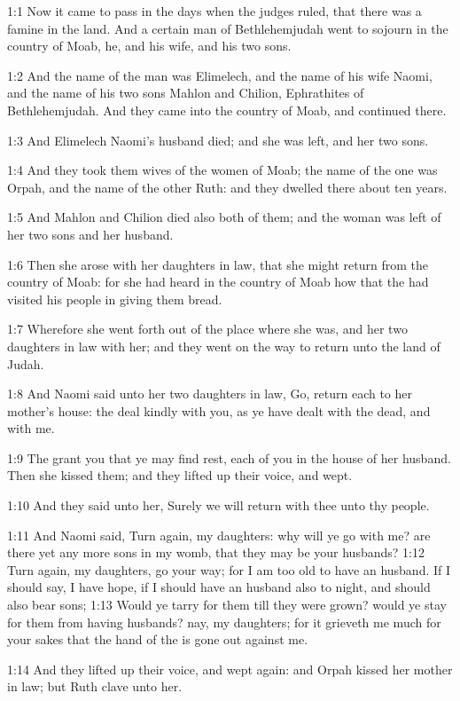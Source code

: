 
1:1 Now it came to pass in the days when the judges ruled, that there
was a famine in the land. And a certain man of Bethlehemjudah went to
sojourn in the country of Moab, he, and his wife, and his two sons.

1:2 And the name of the man was Elimelech, and the name of his wife
Naomi, and the name of his two sons Mahlon and Chilion, Ephrathites of
Bethlehemjudah. And they came into the country of Moab, and continued
there.

1:3 And Elimelech Naomi's husband died; and she was left, and her two
sons.

1:4 And they took them wives of the women of Moab; the name of the one
was Orpah, and the name of the other Ruth: and they dwelled there
about ten years.

1:5 And Mahlon and Chilion died also both of them; and the woman was
left of her two sons and her husband.

1:6 Then she arose with her daughters in law, that she might return
from the country of Moab: for she had heard in the country of Moab how
that the \LORD had visited his people in giving them bread.

1:7 Wherefore she went forth out of the place where she was, and her
two daughters in law with her; and they went on the way to return unto
the land of Judah.

1:8 And Naomi said unto her two daughters in law, Go, return each to
her mother's house: the \LORD deal kindly with you, as ye have dealt
with the dead, and with me.

1:9 The \LORD grant you that ye may find rest, each of you in the house
of her husband. Then she kissed them; and they lifted up their voice,
and wept.

1:10 And they said unto her, Surely we will return with thee unto thy
people.

1:11 And Naomi said, Turn again, my daughters: why will ye go with me?
are there yet any more sons in my womb, that they may be your
husbands?  1:12 Turn again, my daughters, go your way; for I am too
old to have an husband. If I should say, I have hope, if I should have
an husband also to night, and should also bear sons; 1:13 Would ye
tarry for them till they were grown? would ye stay for them from
having husbands? nay, my daughters; for it grieveth me much for your
sakes that the hand of the \LORD is gone out against me.

1:14 And they lifted up their voice, and wept again: and Orpah kissed
her mother in law; but Ruth clave unto her.

